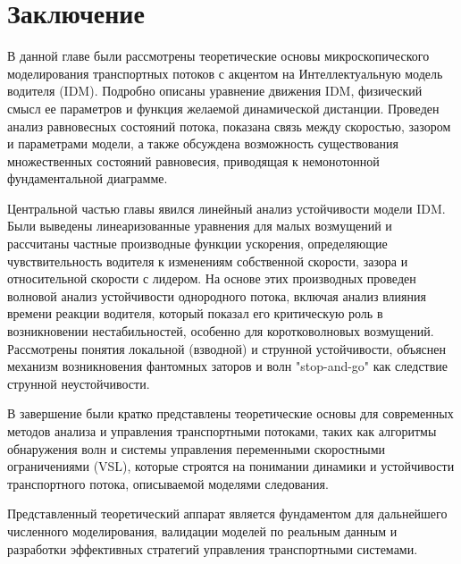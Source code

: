 \documentclass[12pt, a4paper]{article}
\begin{document}
\section{Заключение}
В данной главе были рассмотрены теоретические основы микроскопического моделирования транспортных потоков с акцентом на Интеллектуальную модель водителя (IDM). Подробно описаны уравнение движения IDM, физический смысл ее параметров и функция желаемой динамической дистанции. Проведен анализ равновесных состояний потока, показана связь между скоростью, зазором и параметрами модели, а также обсуждена возможность существования множественных состояний равновесия, приводящая к немонотонной фундаментальной диаграмме.

Центральной частью главы явился линейный анализ устойчивости модели IDM. Были выведены линеаризованные уравнения для малых возмущений и рассчитаны частные производные функции ускорения, определяющие чувствительность водителя к изменениям собственной скорости, зазора и относительной скорости с лидером. На основе этих производных проведен волновой анализ устойчивости однородного потока, включая анализ влияния времени реакции водителя, который показал его критическую роль в возникновении нестабильностей, особенно для коротковолновых возмущений. Рассмотрены понятия локальной (взводной) и струнной устойчивости, объяснен механизм возникновения фантомных заторов и волн "stop-and-go" как следствие струнной неустойчивости.

В завершение были кратко представлены теоретические основы для современных методов анализа и управления транспортными потоками, таких как алгоритмы обнаружения волн и системы управления переменными скоростными ограничениями (VSL), которые строятся на понимании динамики и устойчивости транспортного потока, описываемой моделями следования.

Представленный теоретический аппарат является фундаментом для дальнейшего численного моделирования, валидации моделей по реальным данным и разработки эффективных стратегий управления транспортными системами.
\end{document}
